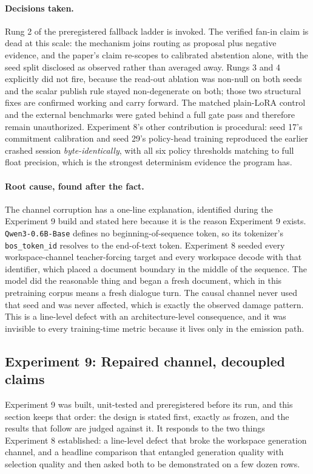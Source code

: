 \documentclass[10pt,a4paper]{article}
\begin{document}
\paragraph{Decisions taken.}
Rung 2 of the preregistered fallback ladder is invoked. The verified fan-in
claim is dead at this scale: the mechanism joins routing as proposal plus
negative evidence, and the paper's claim re-scopes to calibrated abstention
alone, with the seed split disclosed as observed rather than averaged away.
Rungs 3 and 4 explicitly did not fire, because the read-out ablation was
non-null on both seeds and the scalar publish rule stayed non-degenerate on
both; those two structural fixes are confirmed working and carry forward. The
matched plain-LoRA control and the external benchmarks were gated behind a
full gate pass and therefore remain unauthorized. Experiment 8's other
contribution is procedural: seed 17's commitment calibration and seed 29's
policy-head training reproduced the earlier crashed session
\emph{byte-identically}, with all six policy thresholds matching to full float
precision, which is the strongest determinism evidence the program has.

\paragraph{Root cause, found after the fact.}
The channel corruption has a one-line explanation, identified during the
Experiment 9 build and stated here because it is the reason Experiment 9 exists.
\texttt{Qwen3-0.6B-Base} defines no beginning-of-sequence token, so its
tokenizer's \texttt{bos\_token\_id} resolves to the end-of-text token. Experiment
8 seeded every workspace-channel teacher-forcing target and every workspace
decode with that identifier, which placed a document boundary in the middle
of the sequence. The model did the reasonable thing and began a fresh
document, which in this pretraining corpus means a fresh dialogue turn. The
causal channel never used that seed and was never affected, which is exactly
the observed damage pattern. This is a line-level defect with an
architecture-level consequence, and it was invisible to every training-time
metric because it lives only in the emission path.

\subsection{Experiment 9: Repaired channel, decoupled claims}
\label{sec:study9}

Experiment 9 was built, unit-tested and preregistered before its run, and this
section keeps that order: the design is stated first, exactly as frozen, and
the results that follow are judged against it. It responds to the two things
Experiment 8 established: a line-level defect that broke the workspace generation
channel, and a headline comparison that entangled generation quality with
selection quality and then asked both to be demonstrated on a few dozen rows.
\end{document}
